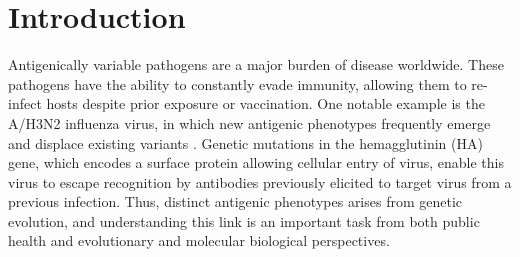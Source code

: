 \documentclass[11pt,oneside,letterpaper]{article}
\begin{document}
\begin{abstract}

\end{abstract}


\pagebreak

\section*{Introduction}

Antigenically variable pathogens are a major burden of disease worldwide. 
These pathogens have the ability to constantly evade immunity, allowing them to re-infect hosts despite prior exposure or vaccination. 
One notable example is the A/H3N2 influenza virus, in which new antigenic phenotypes frequently emerge and displace existing variants \cite{smith_mapping_2004, bedford_integrating_2014}.
Genetic mutations in the hemagglutinin (HA) gene, which encodes a surface protein allowing cellular entry of virus, enable this virus to escape recognition by antibodies previously elicited to target virus from a previous infection. 
Thus, distinct antigenic phenotypes arises from genetic evolution, and understanding this link is an important task from both public health and evolutionary and molecular biological perspectives.
\end{document}
